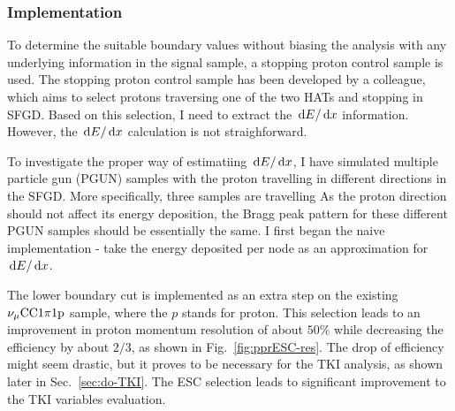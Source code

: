    \subsubsection{Implementation}
   To determine the suitable boundary values without biasing the analysis with any underlying information in the signal sample, a stopping proton control sample is used.
   The stopping proton control sample has been developed by a colleague, which aims to select protons traversing one of the two HATs and stopping in SFGD. 
   Based on this selection, I need to extract the $\,\textrm{d}E/\,\textrm{d}x$ information. 
   However, the $\,\textrm{d}E/\,\textrm{d}x$ calculation is not straighforward. 

   To investigate the proper way of estimatiing $\,\textrm{d}E/\,\textrm{d}x$, I have simulated multiple particle gun (PGUN) samples with the proton travelling in different directions in the SFGD.
   More specifically, three samples are travelling 
   As the proton direction should not affect its energy deposition, the Bragg peak pattern for these different PGUN samples should be essentially the same.
   I first began the naive implementation - take the energy deposited per node as an approximation for $\,\textrm{d}E/\,\textrm{d}x$. 
   
   
   The lower boundary cut is implemented as an extra step on the existing $\nu_{\mu}\textrm{CC}1\pi1\textrm{p}$ sample, where the $p$ stands for proton.
   This selection leads to an improvement in proton momentum resolution of about $50\%$ while decreasing the efficiency by about $2/3$, as shown in Fig.~\ref{fig:pprESC-res}.   
   The drop of efficiency might seem drastic, but it proves to be necessary for the TKI analysis, as shown later in Sec.~\ref{sec:do-TKI}. The ESC selection leads to significant improvement to the TKI variables evaluation. 

